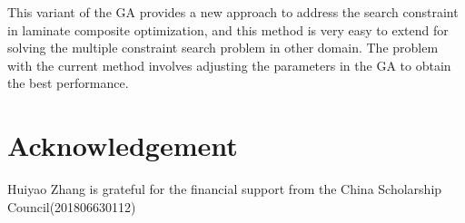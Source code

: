 \documentclass[USenglish]{article}
\begin{document}
This variant of the GA provides a new approach to address the search constraint in laminate composite
optimization, and this method is very easy to extend for solving the multiple constraint search problem in other
domain. The problem with the current method involves adjusting the parameters in the GA to obtain the best
performance.

\section{Acknowledgement}
Huiyao Zhang is grateful for the financial support from the China Scholarship Council(201806630112)






\end{document}
